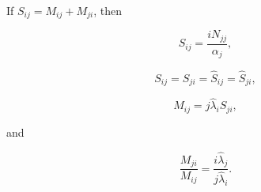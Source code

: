 If $S_{ij} = M_{ij} + M_{ji}$, then

$$S_{ij} = \frac{iN_{jj}}{\alpha_j},$$

$$S_{ij} = S_{ji} = \hat{S}_{ij} = \hat{S}_{ji},$$

$$M_{ij} = j\hat{\lambda}_i S_{ji},$$

and

$$\frac{M_{ji}}{M_{ij}} = \frac{i\hat{\lambda}_j}{j\hat{\lambda}_i}.$$
